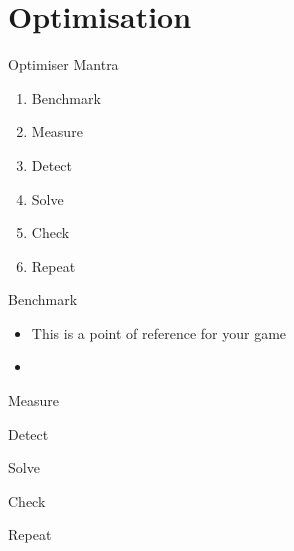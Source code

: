 \part{Optimisation}
\frame{\partpage}

\begin{frame}{Optimiser Mantra}
	\begin{enumerate}
		\pause \item Benchmark
		\pause \item Measure
		\pause \item Detect
		\pause \item Solve
		\pause \item Check
		\pause \item Repeat
	\end{enumerate}
\end{frame}

\begin{frame}{Benchmark}
	\begin{itemize}
		\pause \item This is a point of reference for your game
		\pause \item 
	\end{itemize}
\end{frame}

\begin{frame}{Measure}
\end{frame}

\begin{frame}{Detect}
\end{frame}

\begin{frame}{Solve}
\end{frame}

\begin{frame}{Check}
\end{frame}

\begin{frame}{Repeat}
\end{frame}



